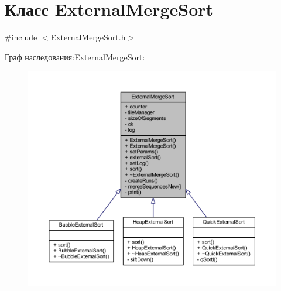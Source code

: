 \hypertarget{class_external_merge_sort}{}\section{Класс External\+Merge\+Sort}
\label{class_external_merge_sort}


{\ttfamily \#include $<$External\+Merge\+Sort.\+h$>$}



Граф наследования\+:External\+Merge\+Sort\+:\nopagebreak
\begin{figure}[H]
\begin{center}
\leavevmode
\includegraphics[width=350pt]{class_external_merge_sort__inherit__graph}
\end{center}
\end{figure}


